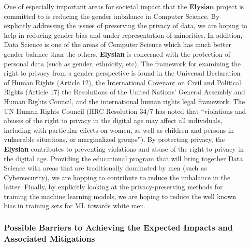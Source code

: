 \documentclass[a4paper,11pt]{article}
\newcommand{\project}[1]{\textbf{#1}\xspace}
\newcommand{\SECURITY}{\project{Elysian}}
\newcommand{\TheProject}{\SECURITY}
\begin{document}
\begin{mdframed}[backgroundcolor=blue!5]
\label{box:gender}
One of especially important areas for societal impact that the \TheProject{} project is committed to is reducing the gender imbalance in Computer Science. By explicitly addressing the issues of preserving the privacy of data, we are hoping to help in reducing gender bias and under-representation of minorities. In addition, Data Science is one of the areas of Computer Science which has much better gender balance than the others. 
%
\TheProject{} is concerned with the protection of personal data (such as gender, ethnicity, etc). The framework for examining the right to privacy from a gender perspective is found in the Universal Declaration of Human Rights (Article 12), the International Covenant on Civil and Political Rights (Article 17) the Resolutions of the United Nations' General Assembly and Human Rights Council, and the international human rights legal framework. The UN Human Rights Council (HRC Resolution 34/7 has noted that ``violations and abuses of the right to privacy in the digital age may affect all individuals, including with particular effects on women, as well as children and persons in vulnerable situations, or marginalized groups''). By protecting privacy, the \TheProject{} contributes to preventing violations and abuse of the right to privacy in the digital age.    %
Providing the educational program that will bring together Data Science with areas that are traditionally dominated by men (such as Cybersecurity), we are hopping to contribute to reduce the imbalance in the latter. Finally, by explicitly looking at the privacy-preserving methods for training the machine learning models, we are hoping to reduce the well known bias in training sets for ML towards white men.  
\end{mdframed}
 

\noindent
\subsubsection*{Possible Barriers to Achieving the Expected Impacts and Associated Mitigations}

\end{document}
